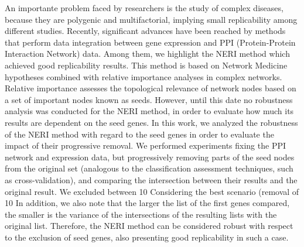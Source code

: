 An importante problem faced by researchers is the study of complex diseases, because they are polygenic and multifactorial, implying small replicability among different studies.
Recently, significant advances have been reached by methods that perform data integration between gene expression and PPI (Protein-Protein Interaction Network) data.
Among them, we highlight the NERI method which achieved good replicability results.
This method is based on Network Medicine hypotheses combined with relative importance analyses in complex networks.
Relative importance assesses the topological relevance of network nodes based on a set of important nodes known as seeds.
However, until this date no robustness analysis was conducted for the NERI method, in order to evaluate how much its results are dependent on the seed genes.
In this work, we analyzed the robustness of the NERI method with regard to the seed genes in order to evaluate the impact of their progressive removal.
We performed experiments fixing the PPI network and expression data, but progressively removing parts of the seed nodes from the original set (analogous to the classification assessment techniques, such as cross-validation), and comparing the intersection between their results and the original result.
We excluded between 10%
Considering the best scenario (removal of 10%
In addition, we also note that the larger the list of the first genes compared, the smaller is the variance of the intersections of the resulting lists with the original list.
Therefore, the NERI method can be considered robust with respect to the exclusion of seed genes, also presenting good replicability in such a case.